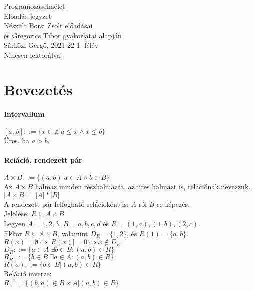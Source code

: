 \documentclass[12pt,a4paper]{article}
\begin{document}
\begin{center}
	\huge
	Programozáselmélet\\
	\vspace{1mm}
	\LARGE
	Előadás jegyzet\\
	\vspace{5mm}
	\large
	Készült Borsi Zsolt előadásai\\
	és Gregorics Tibor gyakorlatai alapján\\
	\vspace{5mm}
	Sárközi Gergő, 2021-22-1. félév\\
	Nincsen lektorálva!
\end{center}

\tableofcontents

\pagebreak

\section{Bevezetés}

\paragraph{Intervallum} $ [a..b] ::= \{ x \in \mathbb{Z} | a \le x \wedge x \le b \}$ \\
Üres, ha $a > b$.

\paragraph{Reláció, rendezett pár} $ A \times B ::= \{ (a,b) | a \in A \wedge b \in B \} $ \\
Az $A \times B$ halmaz minden részhalmazát, az üres halmazt is, relációnak nevezzük. \\
$ | A \times B | = |A| * |B| $ \\
A rendezett pár felfogható relációként is: $A$-ról $B$-re képezés. \\
Jelölése: $R \subseteq A \times B$ \\
Legyen $A={1,2,3}$, $B={a,b,c,d}$ és $R={(1,a), (1,b), (2,c)}$. \\
Ekkor $R \subseteq A \times B$, valamint $D_R = \{1,2\}$, és $R(1)=\{a,b\}$. \\
$R(x) = \emptyset \Leftrightarrow |R(x)|=0 \Leftrightarrow x \notin D_R $ \\
$D_R ::= \{ a \in A | \exists b \in B: (a,b) \in R \}$ \\
$R_R ::= \{ b \in B | \exists a \in A: (a,b) \in R \}$ \\
$R(a) ::= \{ b \in B | (a,b) \in R \} $ \\
Reláció inverze: \\
$R^{-1} = \{(b,a) \in B \times A | (a,b) \in R\}$
\end{document}
